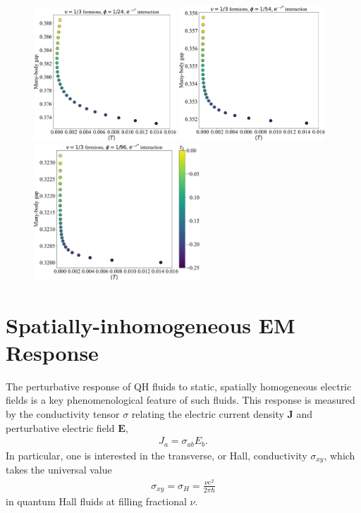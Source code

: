 \documentclass[aps,prb,twocolumn,letterpaper,twoside,nobalancelastpage,groupedaddress,amsmath,amssymb,floatfix,citeautoscript]{revtex4-1}
\begin{document}
\begin{figure}[t]
\includegraphics[width=2.1in]{gap-v-trace-fermions-24-exponential.pdf}
\includegraphics[width=2.15in]{gap-v-trace-fermions-54-exponential.pdf}
\includegraphics[width=2.45in]{gap-v-trace-fermions-96-exponential.pdf}
\caption{\label{gap-v-trace-fermions}}
\end{figure}


\section{Spatially-inhomogeneous EM Response}
The perturbative response of QH fluids to static, spatially homogeneous electric fields is a key phenomenological feature of such fluids. This response is measured by the conductivity tensor $\sigma$ relating the electric current density $\mathbf{J}$ and perturbative electric field $\mathbf{E}$,
\begin{align}
\label{conductivity-eq}
J_{a} = \sigma_{ab}E_b.
\end{align}
In particular, one is interested in the transverse, or Hall, conductivity $\sigma_{xy}$, which takes the universal value
\begin{align*}
\sigma_{xy} = \sigma_{H} = \frac{\nu e^2}{2\pi \hbar}
\end{align*}
in quantum Hall fluids at filling fractional $\nu$.
\end{document}
